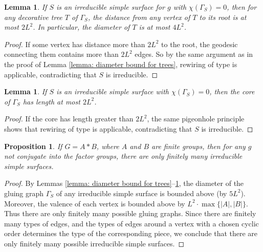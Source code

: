 \documentclass{amsart}
\newtheorem{lemma}[theorem]{Lemma}
\newtheorem{proposition}[theorem]{Proposition}
\theoremstyle{definition}
\numberwithin{equation}{section}
\theoremstyle{theorem}
\theoremstyle{remark}
\newcommand{\RNum}[1]{\uppercase\expandafter{\romannumeral #1\relax}}
\begin{document}
	\begin{lemma}\label{lemma: diameter bound for rooted trees}
		If $S$ is an irreducible simple surface for $g$ with $\chi(\Gamma_S)=0$, then for any decorative tree $T$ of $\Gamma_S$, the distance from any vertex of $T$ to its root is at most $2L^2$. In particular, the diameter of $T$ is at most $4L^2$.
	\end{lemma}
	\begin{proof}
		If some vertex has distance more than $2L^2$ to the root, the geodesic connecting them contains more than $2L^2$ edges. So by the same argument as in the proof of Lemma \ref{lemma: diameter bound for trees}, rewiring of type \RNum{2} is applicable, contradicting that $S$ is irreducible.
	\end{proof}
	
	\begin{lemma}\label{lemma: diameter bound for core}
		If $S$ is an irreducible simple surface with $\chi(\Gamma_S)=0$, then the core of $\Gamma_S$ has length at most $2L^2$.
	\end{lemma}
	\begin{proof}
		If the core has length greater than $2L^2$, the same pigeonhole principle shows that rewiring of type \RNum{3} is applicable, contradicting that $S$ is irreducible.
	\end{proof}
	
	\begin{proposition}\label{prop: finitely many irreducible}
		If $G=A*B$, where $A$ and $B$ are finite groups, then for any $g$ not conjugate into the factor groups, there are only finitely many irreducible simple surfaces.
	\end{proposition}
	\begin{proof}
		By Lemmas \ref{lemma: diameter bound for trees}--\ref{lemma: diameter bound for core}, the diameter of the gluing graph $\Gamma_S$ of any irreducible simple surface is bounded above (by $5L^2$). Moreover, the valence of each vertex is bounded above by $L^2\cdot \max\{|A|,|B|\}$. Thus there are only finitely many possible gluing graphs. Since there are finitely many types of edges, and the types of edges around a vertex with a chosen cyclic order determines the type of the corresponding piece, we conclude that there are only finitely many possible irreducible simple surfaces.
	\end{proof}
	
\end{document}
